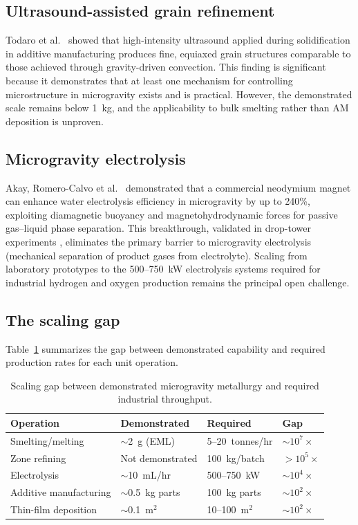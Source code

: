 \documentclass[preprint,12pt]{elsarticle}
\begin{document}
\subsection{Ultrasound-assisted grain refinement}

Todaro et al.\ \cite{todaro2020} showed that high-intensity ultrasound applied during solidification in additive manufacturing produces fine, equiaxed grain structures comparable to those achieved through gravity-driven convection. This finding is significant because it demonstrates that at least one mechanism for controlling microstructure in microgravity exists and is practical. However, the demonstrated scale remains below 1~kg, and the applicability to bulk smelting rather than AM deposition is unproven.

\subsection{Microgravity electrolysis}

Akay, Romero-Calvo et al.\ \cite{akay2025} demonstrated that a commercial neodymium magnet can enhance water electrolysis efficiency in microgravity by up to 240\%, exploiting diamagnetic buoyancy and magnetohydrodynamic forces for passive gas--liquid phase separation. This breakthrough, validated in drop-tower experiments \cite{romerocalo2022}, eliminates the primary barrier to microgravity electrolysis (mechanical separation of product gases from electrolyte). Scaling from laboratory prototypes to the 500--750~kW electrolysis systems required for industrial hydrogen and oxygen production remains the principal open challenge.

\subsection{The scaling gap}

Table~\ref{tab:scaling-gap} summarizes the gap between demonstrated capability and required production rates for each unit operation.

\begin{table}[ht]
\centering
\caption{Scaling gap between demonstrated microgravity metallurgy and required industrial throughput.}
\label{tab:scaling-gap}
\begin{tabular}{llll}
\toprule
\textbf{Operation} & \textbf{Demonstrated} & \textbf{Required} & \textbf{Gap} \\
\midrule
Smelting/melting & $\sim$2~g (EML) & 5--20~tonnes/hr & $\sim 10^{7}\times$ \\
Zone refining & Not demonstrated & 100~kg/batch & $> 10^{5}\times$ \\
Electrolysis & $\sim$10~mL/hr & 500--750~kW & $\sim 10^{4}\times$ \\
Additive manufacturing & $\sim$0.5~kg parts & 100~kg parts & $\sim 10^{2}\times$ \\
Thin-film deposition & $\sim$0.1~m$^2$ & 10--100~m$^2$ & $\sim 10^{2}\times$ \\
\bottomrule
\end{tabular}
\end{table}
\end{document}
